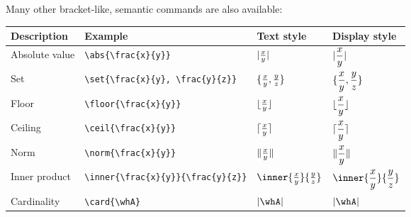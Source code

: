 \documentclass{article}
\begin{document}
Many other bracket-like, semantic commands are also available:

\begin{center}
\begin{tabular}{@{}llll@{}}
\toprule
Description				& Example 					& Text style 				& Display style \\ \midrule
Absolute value 			& \verb!\abs{\frac{x}{y}}!        	& $\lvert\frac{x}{y}\rvert$ 		& $\displaystyle\lvert\frac{x}{y}\rvert$ \\[10pt]
Set 					& \verb!\set{\frac{x}{y}, \frac{y}{z}}!        & $\{\frac{x}{y}, \frac{y}{z}\}$ 	& $\displaystyle\{\frac{x}{y}, \frac{y}{z}\}$ \\[10pt]
Floor					& \verb!\floor{\frac{x}{y}}!        	& $\lfloor\frac{x}{y}\rfloor$ 		& $\displaystyle\lfloor\frac{x}{y}\rfloor$ \\[10pt]
Ceiling 				& \verb!\ceil{\frac{x}{y}}!        	& $\lceil\frac{x}{y}\rceil$ 		& $\displaystyle\lceil\frac{x}{y}\rceil$ \\[10pt]
Norm					& \verb!\norm{\frac{x}{y}}!       	& $\lVert\frac{x}{y}\rVert$ 	& $\displaystyle\lVert\frac{x}{y}\rVert$ \\[10pt]
Inner product			& \verb!\inner{\frac{x}{y}}{\frac{y}{z}}!       	& $\inner{\frac{x}{y}}{\frac{y}{z}}$ 	& $\displaystyle\inner{\frac{x}{y}}{\frac{y}{z}}$ \\[10pt]
Cardinality 				& \verb!\card{\whA}!       		& $\card{\whA}$ 			& $\displaystyle\card{\whA}$ \\[10pt]
\bottomrule
\end{tabular}
\end{center}

%
\end{document}
